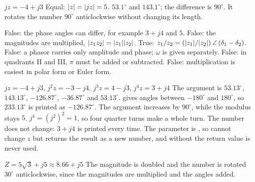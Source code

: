 \begin{facit}
  $jz = -4 + j3$  Equal: $\lvert z\rvert = \lvert jz\rvert = 5$.
 $53.1^{\circ}$ and $143.1^{\circ}$; the difference is $90^{\circ}$.
 It rotates the number $90^{\circ}$ anticlockwise without changing its length.

  False: the phase angles can differ, for example $3 + j4$ and $5$.
 False: the magnitudes are multiplied, $\lvert z_1z_2\rvert = \lvert z_1\rvert\lvert z_2\rvert$.
 True: $z_1/z_2 = (\lvert z_1\rvert/\lvert z_2\rvert)\,\angle\,(\delta_1 - \delta_2)$.
 False: a phasor carries only amplitude and phase; $\omega$ is given separately.
 False: in quadrants II and III, $\pi$ must be added or subtracted.
 False: multiplication is easiest in polar form or Euler form.

  $jz = -4 + j3$, $j^2 z = -3 - j4$, $j^3 z = 4 - j3$, $j^4 z = 3 + j4$
 The argument is $53.13^{\circ}$, $143.13^{\circ}$, $-126.87^{\circ}$, $-36.87^{\circ}$ and
$53.13^{\circ}$.  gives angles between $-180^{\circ}$ and $180^{\circ}$, so
$233.13^{\circ}$ is printed as $-126.87^{\circ}$.
 The argument increases by $90^{\circ}$, while the modulus stays $5$. $j^4 = (j^2)^2 = 1$, so
four quarter turns make a whole turn.
 The number does not change: $3 + j4$ is printed every time. The parameter is , so  cannot change $z$ but returns the result as a new number,
and without  the return value is never used.

  $Z = 5\sqrt{3} + j5 \approx 8.66 + j5$
 The magnitude is doubled and the number is rotated $30^{\circ}$ anticlockwise, since the
magnitudes are multiplied and the angles added.

\end{facit}
